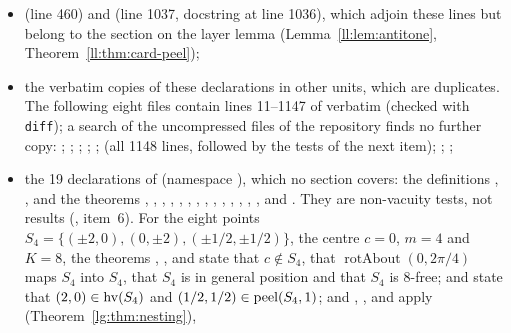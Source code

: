 \begin{itemize}
\item {} (line 460) and  (line 1037, docstring at line 1036), which adjoin these
  lines but belong to the section on the layer lemma (Lemma~\ref{ll:lem:antitone}, Theorem~\ref{ll:thm:card-peel});
\item the verbatim copies of these declarations in other units, which are duplicates. The following eight files
  contain lines 11--1147 of  verbatim (checked with \texttt{diff}); a search of the
  uncompressed files of the repository finds no further copy:\newline
  ;\newline
  ;\newline
  ;\newline
  ;\newline
  ;\newline
   (all 1148 lines, followed by the tests of the next item);\newline
  ;\newline
  ;
\item the 19 declarations of  (namespace
  ), which no section covers: the definitions , ,  and
  the theorems , , , , , , ,
  , , , , , , , 
  and . They are non-vacuity tests, not results (, item~6). For the eight
  points $S_4=\{(\pm2,0),(0,\pm2),(\pm1/2,\pm1/2)\}$, the centre $c=0$, $m=4$ and $K=8$, the theorems ,
  ,  and  state that $c\notin S_4$, that $\operatorname{rotAbout}(0,2\pi/4)$ maps $S_4$
  into $S_4$, that $S_4$ is in general position and that $S_4$ is $8$-free;  and  state that
  $(2,0)\in\operatorname{hv}(S_4)$ and $(1/2,1/2)\in\operatorname{peel}(S_4,1)$; and , ,  and 
  apply  (Theorem~\ref{lg:thm:nesting}), 

\end{itemize}
